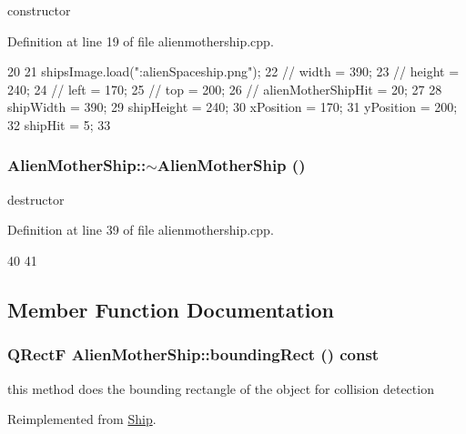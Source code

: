 constructor 

Definition at line 19 of file alienmothership.cpp.


\begin{DoxyCode}
20 {
21     shipsImage.load(":alienSpaceship.png");
22 //    width = 390;
23 //    height = 240;
24 //    left = 170;
25 //    top = 200;
26 //    alienMotherShipHit = 20;
27 
28     shipWidth = 390;
29     shipHeight = 240;
30     xPosition = 170;
31     yPosition = 200;
32     shipHit = 5;
33 }
\end{DoxyCode}
\hypertarget{class_alien_mother_ship_aadc7f7009cd3243f28589e35157ab5fc}{
\subsubsection[{$\sim$AlienMotherShip}]{\setlength{\rightskip}{0pt plus 5cm}AlienMotherShip::$\sim$AlienMotherShip ()}}
\label{class_alien_mother_ship_aadc7f7009cd3243f28589e35157ab5fc}
destructor 

Definition at line 39 of file alienmothership.cpp.


\begin{DoxyCode}
40 {
41 }
\end{DoxyCode}


\subsection{Member Function Documentation}
\hypertarget{class_alien_mother_ship_a19b3012b5de609d1b3aeb853bc45489f}{
\subsubsection[{boundingRect}]{\setlength{\rightskip}{0pt plus 5cm}QRectF AlienMotherShip::boundingRect () const}}
\label{class_alien_mother_ship_a19b3012b5de609d1b3aeb853bc45489f}
this method does the bounding rectangle of the object for collision detection 

Reimplemented from \hyperlink{class_ship_a40856df827844b4045eb97345f401995}{Ship}.

